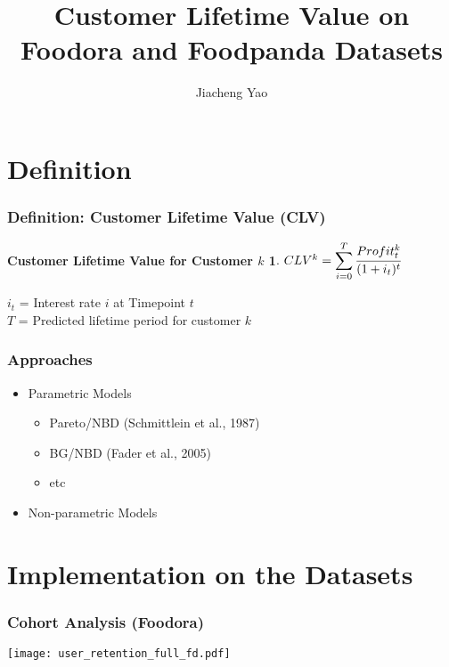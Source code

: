 \documentclass{beamer} %
\title{Customer Lifetime Value on Foodora and Foodpanda Datasets}
\author{Jiacheng Yao}
\institute{Mathemads, Rocket Internet SE}
\theoremstyle{definition} %
\newtheorem*{dfn}{Customer Lifetime Value for Customer $k$}
\begin{document}
\begin{frame} 
\titlepage
\end{frame}

\section{Definition} %

\begin{frame} 
\frametitle{Definition: Customer Lifetime Value (CLV)}

\begin{dfn} %
$CLV^{k} = \displaystyle\sum_{i=0}^{T} \cfrac{Profit_t^{k}}{(1+i_t)^{t}}$ 
\end{dfn}

\pause $i_t$ = Interest rate $i$ at Timepoint $t$ \\
\pause $T$ = Predicted lifetime period for customer $k$

\end{frame}

\begin{frame}
\frametitle{Approaches}

\begin{itemize}
\item Parametric Models
\begin{itemize}
\pause \item Pareto/NBD (Schmittlein et al., 1987)
\pause \item BG/NBD (Fader et al., 2005)
\pause \item etc 
\end{itemize}
\item Non-parametric Models
\end{itemize}

\end{frame}

\section{Implementation on the Datasets}

\begin{frame}
\frametitle{Cohort Analysis (Foodora)}

\begin{center}
            \texttt{[image: user\_retention\_full\_fd.pdf]}
        \end{center}
\end{frame}
\end{document}
